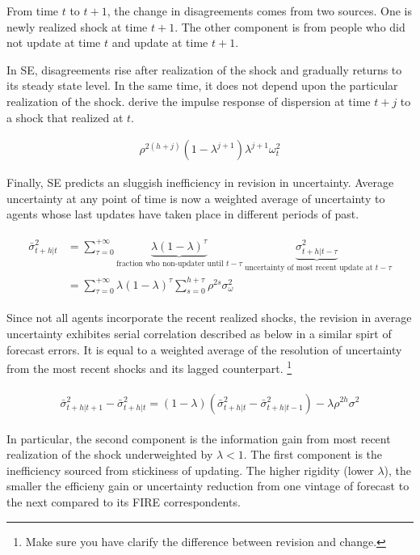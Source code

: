 \documentclass[]{article}
\begin{document}
From time $t$ to $t+1$, the change in disagreements comes from two sources. One is newly realized shock at time $t+1$. The other component is from people who did not update at time $t$ and update at time $t+1$.  

In SE, disagreements rise after realization of the shock and gradually returns to its steady state level. In the same time, it does not depend upon the particular realization of the shock. \cite{coibion2012can} derive the impulse response of dispersion at time $t+j$ to a shock that realized at $t$. 

\begin{eqnarray}
\rho^{2(h+j)} (1-\lambda^{j+1})\lambda^{j+1} \omega^2_t
\end{eqnarray}

Finally, SE predicts an sluggish inefficiency in revision in uncertainty. Average uncertainty at any point of time is now a weighted average of uncertainty to agents whose last updates have taken place in different periods of past.  

\begin{eqnarray}
\begin{aligned}
\bar \sigma^2_{t+h|t} & = \sum^{+\infty}_{\tau =0} \underbrace{\lambda (1-\lambda)^\tau}_{\text{fraction who non-updater until }t-\tau} \underbrace{\sigma^2_{t+h|t-\tau}}_{\text{ uncertainty of most recent update at }t-\tau} \\
& = \sum^{+\infty}_{\tau =0} \lambda (1-\lambda)^\tau \sum^{h+\tau}_{s=0}\rho^{2s} \sigma^2_{\omega}
\end{aligned}
\end{eqnarray}

Since not all agents incorporate the recent realized shocks, the revision in average uncertainty exhibites serial correlation described as below in a similar spirt of forecast errors. It is equal to a weighted average of the resolution of uncertainty from the most recent shocks and its lagged counterpart. \footnote{Make sure you have clarify the difference between revision and change.}


\begin{eqnarray}
\begin{aligned}
\bar \sigma^2_{t+h|t+1} - \bar \sigma^2_{t+h|t} = (1-\lambda)(
\bar \sigma^2_{t+h|t} - \bar \sigma^2_{t+h|t-1}) -\lambda \rho^{2h} \sigma^2 
\end{aligned}
\end{eqnarray}

 In particular, the second component is the information gain from most recent realization of the shock underweighted by $\lambda<1$. The first component is the inefficiency sourced from stickiness of updating. The higher rigidity (lower $\lambda$), the smaller the efficieny gain or uncertainty reduction from one vintage of forecast to the next compared to its FIRE correspondents. 
\end{document}
